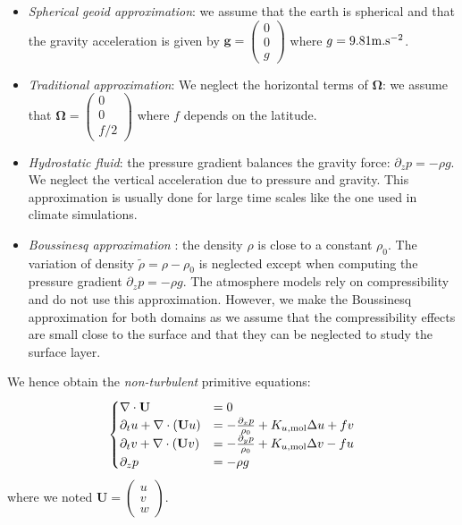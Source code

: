 \begin{itemize}
\item \textit{Spherical geoid approximation}:
we assume that the earth is spherical and that the
gravity acceleration is given by
$\mathbf{g} =\begin{pmatrix}
0\\ 0 \\ g
\end{pmatrix}$ where $g=9.81 {\rm m}.{\rm s}^{-2}$.
\item \textit{Traditional approximation}:
We neglect the horizontal terms of
$\mathbf{\Omega}$: we assume that
$\mathbf{\Omega} =\begin{pmatrix}
0\\ 0 \\ f/2
\end{pmatrix}$ where $f$ depends on the latitude.
\item \textit{Hydrostatic fluid}:
the pressure gradient balances the gravity force:
$\partial_z p = -\rho g$. We neglect the vertical
acceleration due to pressure and gravity.
This approximation is usually done for large time
scales like the one used in climate simulations.
\item \textit{Boussinesq approximation}
\citep{boussinesq_theorie_1903}:
the density $\rho$ is close to a constant $\rho_0$.
The variation of density $\widetilde{\rho} =
\rho - \rho_0$ is neglected except when computing
the pressure gradient $\partial_z p = - \rho g$.
The atmosphere models rely on compressibility and
do not use this approximation. However, we make
the Boussinesq approximation for both domains
as we assume that the compressibility effects
are small close to the surface and that they
can be neglected to study the surface layer.
\end{itemize}
We hence obtain the \textit{non-turbulent}
primitive equations:
\begin{equation}
	\label{eq:airseaSCM_nonTurbulentPrimitiveEq}
\begin{cases}
	\nabla \cdot \mathbf{U} &= 0 \\
	\partial_t u + \nabla \cdot (\mathbf{U} u) &=
	- \frac{\partial_x p}{\rho_0} + K_{u, {\rm mol}} \Delta u
	+ f v \\
	\partial_t v + \nabla \cdot (\mathbf{U} v) &=
	- \frac{\partial_y p}{\rho_0} + K_{u, {\rm mol}} \Delta v
	- f u \\
	\partial_z p &= -\rho g
\end{cases}
\end{equation}
where we noted $\mathbf{U} = \begin{pmatrix}u\\v\\w\end{pmatrix}$.

